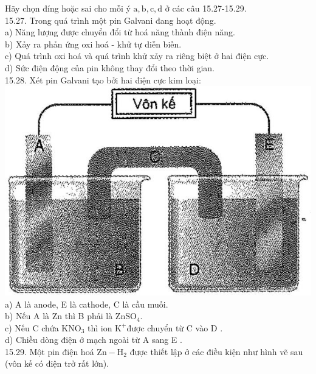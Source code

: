 \documentclass[10pt]{article}
\begin{document}
Hãy chọn đíng hoặc sai cho mỗi ý $\mathrm{a}, \mathrm{b}, \mathrm{c}, \mathrm{d}$ ở các câu 15.27-15.29.\\
15.27. Trong quá trình một pin Galvani đang hoạt động.\\
a) Năng lượng được chuyển đổi từ hoá năng thành điện năng.\\
b) Xảy ra phản ứng oxi hoá - khử tự diễn biến.\\
c) Quá trình oxi hoá và quá trình khử xảy ra riêng biệt ở hai điện cực.\\
d) Sức điện động của pin không thay đổi theo thời gian.\\
15.28. Xét pin Galvani tạo bởi hai điện cực kim loại:\\
\includegraphics[max width=\textwidth, center]{2025_10_23_74efce88ce3a451fd6b0g-048}\\
a) A là anode, E là cathode, C là cầu muối.\\
b) Nếu A là Zn thì B phải là $\mathrm{ZnSO}_{4}$.\\
c) Nếu C chứa $\mathrm{KNO}_{3}$ thì ion $\mathrm{K}^{+}$được chuyển từ C vào D .\\
d) Chiều dòng điện ở mạch ngoài từ A sang E .\\
15.29. Một pin điện hoá $\mathrm{Zn}-\mathrm{H}_{2}$ được thiết lập ở các điều kiện như hình vẽ sau (vôn kế có điện trở rất lớn).\\
\end{document}
